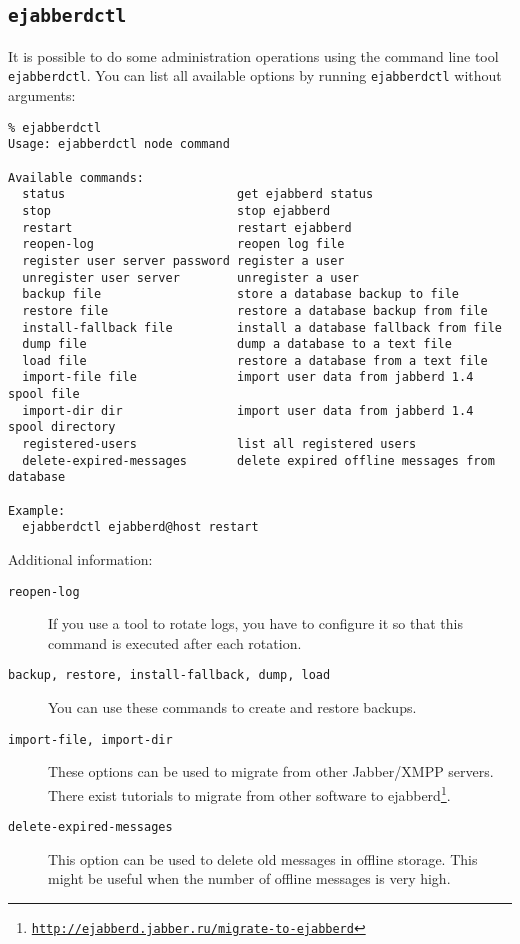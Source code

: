 \documentclass[a4paper,10pt]{article}
\newcommand{\ind}[1]{\begin{latexonly}\index{#1}\end{latexonly}}
\newcommand{\bracehack}{\def\{{\char"7B}\def\}{\char"7D}}
\newcommand{\titem}[1]{\item[\bracehack\texttt{#1}]}
\newcommand{\term}[1]{\texttt{#1}}
\newcommand{\Jabber}{Jabber}
\gdef\footahref#1#2{#2\footnote{\href{#1}{\texttt{#1}}}}
\begin{document}
\subsection{\term{ejabberdctl}}
\label{ejabberdctl}

It is possible to do some administration operations using the command
line tool \term{ejabberdctl}. You can list all available options by
running \term{ejabberdctl} without arguments:
\begin{verbatim}
% ejabberdctl
Usage: ejabberdctl node command

Available commands:
  status                        get ejabberd status
  stop                          stop ejabberd
  restart                       restart ejabberd
  reopen-log                    reopen log file
  register user server password register a user
  unregister user server        unregister a user
  backup file                   store a database backup to file
  restore file                  restore a database backup from file
  install-fallback file         install a database fallback from file
  dump file                     dump a database to a text file
  load file                     restore a database from a text file
  import-file file              import user data from jabberd 1.4 spool file
  import-dir dir                import user data from jabberd 1.4 spool directory
  registered-users              list all registered users
  delete-expired-messages       delete expired offline messages from database

Example:
  ejabberdctl ejabberd@host restart
\end{verbatim}

Additional information:
\begin{description}
\titem{reopen-log } If you use a tool to rotate logs, you have to configure it
  so that this command is executed after each rotation.
\titem {backup, restore, install-fallback, dump, load} You can use these
  commands to create and restore backups. 
\titem{import-file, import-dir} \ind{migration from other software}
  These options can be used to migrate from other \Jabber{}/XMPP servers. There
  exist tutorials to \footahref{http://ejabberd.jabber.ru/migrate-to-ejabberd}{migrate from other software to ejabberd}.
\titem{delete-expired-messages} This option can be used to delete old messages
  in offline storage. This might be useful when the number of offline messages
  is very high.
\end{description}
\end{document}
